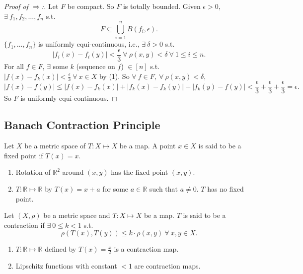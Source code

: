 \documentclass{functionspaces}
\begin{document}
\begin{proof}[Proof of $\Longrightarrow$:]
Let $F$ be compact. So $F$ is totally bounded. Given $\epsilon>0$, $\exists\ f_{1},f_{2},\ldots,f_{n}$ s.t.
\[
F\subseteq\bigcup_{i=1}^{n}B(f_{i},\epsilon). \tag{1}
\]
$\{f_{1},\ldots,f_{n}\}$ is uniformly equi-continuous, i.e., $\exists\ \delta>0$ s.t.
\[
|f_{i}(x)-f_{i}(y)|<\frac{\epsilon}{3}\ \forall\ \rho(x,y)<\delta\ \forall\ 1\leq i\leq n.
\]
For all $f\in F$, $\exists$ some $k$ (sequence on $f$) $\in[n]$ s.t. $|f(x)-f_{k}(x)|<\frac{\epsilon}{3}\ \forall\ x\in X$ by (1). So $\forall\ f\in F,\ \forall\ \rho(x,y)<\delta$,
\[
|f(x)-f(y)|\leq|f(x)-f_{k}(x)|+|f_{k}(x)-f_{k}(y)|+|f_{k}(y)-f(y)|<\frac{\epsilon}{3}+\frac{\epsilon}{3}+\frac{\epsilon}{3}=\epsilon.
\]
So $F$ is uniformly equi-continuous. 
\end{proof}

\subsection{Banach Contraction Principle}

\begin{definition}
Let $X$ be a metric space of $T:X\mapsto X$ be a map. A point $x\in X$ is said to be a fixed point if $T(x)=x$.
\end{definition}

\begin{example}
\begin{enumerate}
\item Rotation of $\mathbb{R}^{2}$ around $(x,y)$ has the fixed point $(x,y)$.
\item $T:\mathbb{R}\mapsto\mathbb{R}$ by $T(x)=x+a$ for some $a\in\mathbb{R}$ such that $a\neq 0$. $T$ has no fixed point.
\end{enumerate}
\end{example}

\begin{definition}
Let $(X,\rho)$ be a metric space and $T:X\mapsto X$ be a map. $T$ is said to be a contraction if $\exists\ 0\leq k<1$ s.t.
\[
\rho(T(x),T(y))\leq k\cdot\rho(x,y)\ \forall\ x,y\in X.
\]
\end{definition}

\begin{example}
\begin{enumerate}
\item $T:\mathbb{R}\mapsto\mathbb{R}$ defined by $T(x)=\frac{x}{2}$ is a contraction map.
\item Lipschitz functions with constant $<1$ are contraction maps.
\end{enumerate}
\end{example}
\end{document}
